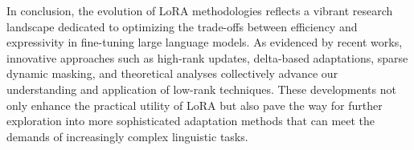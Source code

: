 \documentclass[conference]{IEEEtran}
\begin{document}
In conclusion, the evolution of LoRA methodologies reflects a vibrant research landscape dedicated to optimizing the trade-offs between efficiency and expressivity in fine-tuning large language models. As evidenced by recent works, innovative approaches such as high-rank updates, delta-based adaptations, sparse dynamic masking, and theoretical analyses collectively advance our understanding and application of low-rank techniques. These developments not only enhance the practical utility of LoRA but also pave the way for further exploration into more sophisticated adaptation methods that can meet the demands of increasingly complex linguistic tasks.
\end{document}
